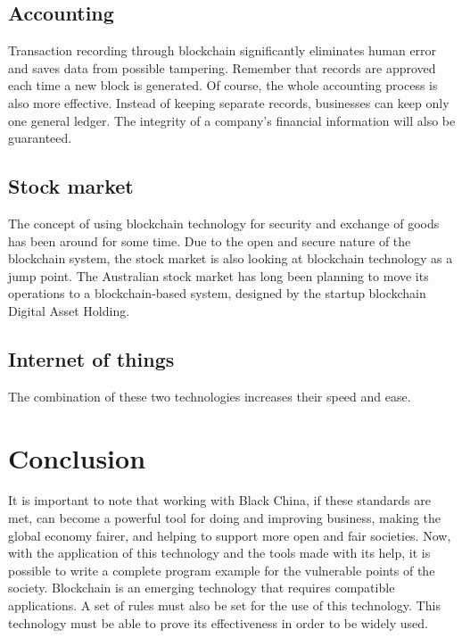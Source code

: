 \subsection{Accounting}
Transaction recording through blockchain significantly eliminates human error and saves data from possible tampering. Remember that records are approved each time a new block is generated. Of course, the whole accounting process is also more effective. Instead of keeping separate records, businesses can keep only one general ledger. The integrity of a company's financial information will also be guaranteed.

\subsection{Stock market}
The concept of using blockchain technology for security and exchange of goods has been around for some time. Due to the open and secure nature of the blockchain system, the stock market is also looking at blockchain technology as a jump point. The Australian stock market has long been planning to move its operations to a blockchain-based system, designed by the startup blockchain Digital Asset Holding.

\subsection{Internet of things}
The combination of these two technologies increases their speed and ease.

\section{Conclusion}
It is important to note that working with Black China, if these standards are met, can become a powerful tool for doing and improving business, making the global economy fairer, and helping to support more open and fair societies.
Now, with the application of this technology and the tools made with its help, it is possible to write a complete program example for the vulnerable points of the society. Blockchain is an emerging technology that requires compatible applications. A set of rules must also be set for the use of this technology. This technology must be able to prove its effectiveness in order to be widely used.

